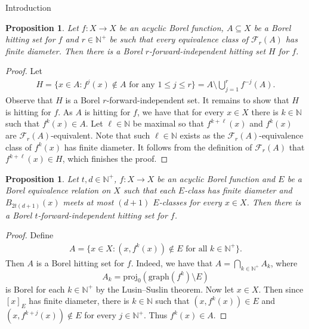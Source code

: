 \documentclass[psamsfonts]{amsart}
\newtheorem{prop}[thm]{Proposition}
\theoremstyle{definition}
\newcommand{\N}{\mathbb N}
\theoremstyle{remark}
\numberwithin{equation}{section}
\newcommand\mcal{\mathcal}
\begin{document}
\begin{section}{Introduction}
\begin{prop}\label{pr:CovToFIH}
    Let $f:X\to X$ be an acyclic Borel function, $A\subseteq X$ be a Borel hitting set for $f$ and $r\in\N^+$ be such that every equivalence class of $\mcal{F}_r(A)$ has finite diameter.
    Then there is a Borel $r$-forward-independent hitting set $H$ for $f$.
\end{prop}
\begin{proof}
    Let 
        \begin{align*}
            H = \{x \in A : f^j(x) \notin A \text{ for any $1 \leq j \leq r$} \}=A\setminus \bigcup_{j=1}^r f^{-j}(A).
        \end{align*}
    Observe that $H$ is a Borel $r$-forward-independent set.
    It remains to show that $H$ is hitting for $f$.
    As $A$ is hitting for $f$, we have that for every $x\in X$ there is $k\in \N$ such that $f^k(x)\in A$.
    Let $\ell\in \N$ be maximal so that $f^{k+\ell}(x)$ and $f^k(x)$ are $\mcal{F}_r(A)$-equivalent.
    Note that such $\ell\in\N$ exists as the $\mcal{F}_r(A)$-equivalence class of $f^k(x)$ has finite diameter.
    It follows from the definition of $\mcal{F}_r(A)$ that $f^{k+\ell}(x)\in H$, which finishes the proof.
\end{proof}




\begin{prop}\label{pr:EqRelToHit}
    Let $t,d\in \N^+$, $f:X\to X$ be an acyclic Borel function and $E$ be a Borel equivalence relation on $X$ such that each $E$-class has finite diameter and $B_{2t(d+1)}(x)$ meets at most $(d+1)$ $E$-classes for every $x\in X$.
    Then there is a Borel $t$-forward-independent hitting set for $f$.
\end{prop}
\begin{proof}
    Define
    \begin{align*}
        A = \{x \in X : (x, f^k(x)) \notin E \text{ for all $k \in \N^+$} \}.
    \end{align*}
    Then $A$ is a Borel hitting set for $f$.
    Indeed, we have that $A = \bigcap_{k \in \N^+} A_k$, where
    $$A_k = \text{proj}_0(\text{graph}(f^k) \setminus E)$$
    is Borel for each $k \in \N^+$ by the Lusin--Suslin theorem.
    Now let $x \in X$.
    Then since $[x]_E$ has finite diameter, there is $k \in \N$ such that $(x, f^k(x)) \in E$ and $(x, f^{k + j}(x)) \notin E$ for every $j \in \N^+$.
    Thus $f^k(x) \in A$.


\end{proof}
\end{section}
\end{document}
